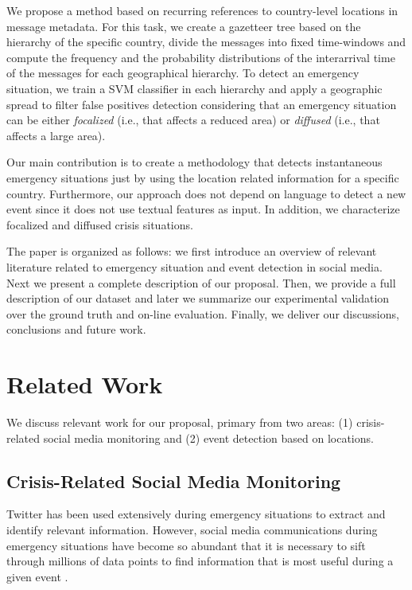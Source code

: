 \documentclass[sigconf]{acmart}
\begin{document}
We propose a method based on recurring references to country-level locations in message metadata. For this task, we create a gazetteer tree based on the hierarchy of the specific country, divide the messages into fixed time-windows and compute the frequency and the probability distributions of the interarrival time of the messages for each geographical hierarchy. To detect an emergency situation, we train a SVM classifier in each hierarchy and apply a geographic spread to filter false positives detection considering that an emergency situation can be either \textit{focalized} (i.e., that affects a reduced area) or \textit{diffused} (i.e., that affects a large area).

Our main contribution is to create a methodology that detects instantaneous emergency situations just by using the location related information for a specific country. Furthermore, our approach does not depend on language to detect a new event since it does not use textual features as input. In addition, we characterize focalized and diffused crisis situations.

The paper is organized as follows: we first introduce an overview of relevant literature related to emergency situation and event detection in social media. Next we present a complete description of our proposal. Then, we provide a full description of our dataset and later we summarize our experimental validation over the ground truth and on-line evaluation. Finally, we deliver our discussions, conclusions and future work.



\section{Related Work}

We discuss relevant work for our proposal, primary from two areas: (1) crisis-related social media monitoring and (2) event detection based on locations.

\subsection{Crisis-Related Social Media Monitoring}

Twitter has been used extensively during emergency situations to extract and identify relevant information. However, social media communications during emergency situations have become so abundant that it is necessary to sift through millions of data points to find information that is most useful during a given event \cite{imran2015processing}.
\end{document}
